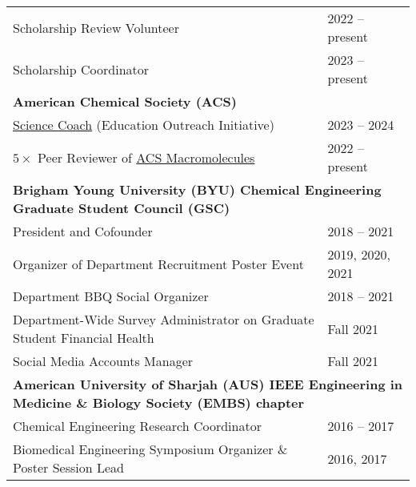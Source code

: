 \documentclass[letterpaper,11pt]{article}
\begin{document}
\begin{tabular}{@{}p{}l@{}}
  \hspace{3mm} Scholarship Review Volunteer                                                                                                  & 2022 -- present \\
  \hspace{3mm} Scholarship Coordinator                                                                                                       & 2023 -- present \\[4pt]
  \multicolumn{2}{l}{\hspace{-3mm} \bf{American Chemical Society (ACS)}} \\
  \hspace{3mm} \href{https://www.acs.org/education/outreach/science-coaches.html}{Science Coach} (Education Outreach Initiative)										& 2023 -- 2024\\
  \hspace{3mm} $5\times$ Peer Reviewer of \href{https://pubs.acs.org/journal/mamobx}{ACS Macromolecules}					& 2022 -- present\\[4pt]
  \multicolumn{2}{l}{\hspace{-3mm} \bf{Brigham Young University (BYU) Chemical Engineering Graduate Student Council (GSC)}} \\
  \hspace{3mm} President and Cofounder                                                                                                       & 2018 -- 2021 \\
  \hspace{3mm} Organizer of Department Recruitment Poster Event                                                                              & 2019, 2020, 2021 \\
  \hspace{3mm} Department BBQ Social Organizer                                                                                               & 2018 -- 2021 \\
  \hspace{3mm} Department-Wide Survey Administrator on Graduate Student Financial Health                                                      & Fall 2021 \\[4pt]
  \hspace{3mm} Social Media Accounts Manager						                                                      & Fall 2021 \\[4pt]
  \multicolumn{2}{l}{\hspace{-3mm} \bf{American University of Sharjah (AUS) IEEE Engineering in Medicine \& Biology Society (EMBS) chapter}} \\
  \hspace{3mm} Chemical Engineering Research Coordinator                                                                                     & 2016 -- 2017 \\
  \hspace{3mm} Biomedical Engineering Symposium Organizer \& Poster Session Lead                                                             & 2016, 2017 \\
\end{tabular} \\
\end{document}
